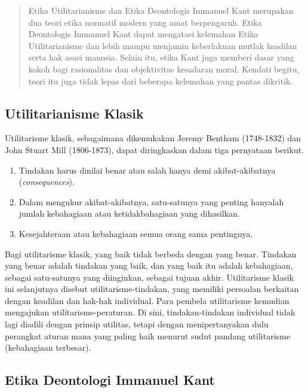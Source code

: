 \documentclass[11pt,twoside,a5paper,openany]{memoir}
\def\tightlist{}
\begin{document}
\begin{quote}
Etika Utilitarianisme dan Etika Deontologis Immanuel Kant merupakan dua
teori etika normatif modern yang amat berpengaruh. Etika Deontologis
Immanuel Kant dapat mengatasi kelemahan Etika Utilitarianisme dan lebih
mampu menjamin keberlakuan mutlak keadilan serta hak asasi manusia.
Selain itu, etika Kant juga memberi dasar yang kokoh bagi rasionalitas
dan objektivitas kesadaran moral. Kendati begitu, teori itu juga tidak
lepas dari beberapa kelemahan yang pantas dikritik.
\end{quote}

\hypertarget{utilitarianisme-klasik}{%
\subsection{Utilitarianisme Klasik}\label{utilitarianisme-klasik}}

Utilitarisme klasik, sebagaimana dikemukakan Jeremy Bentham (1748-1832)
dan John Stuart Mill (1806-1873), dapat diringkaskan dalam tiga
pernyataan berikut.

\begin{enumerate}
\def\labelenumi{\arabic{enumi}.}
\tightlist
\item
  Tindakan harus dinilai benar atau salah hanya demi akibat-akibatnya
  (\emph{consequences}).
\item
  Dalam mengukur akibat-akibatnya, satu-satunya yang penting hanyalah
  jumlah kebahagiaan atau ketidakbahagiaan yang dihasilkan.
\item
  Kesejahteraan atau kebahagiaan semua orang sama pentingnya.
\end{enumerate}

Bagi utilitarisme klasik, yang baik tidak berbeda dengan yang benar.
Tindakan yang benar adalah tindakan yang baik, dan yang baik itu adalah
kebahagiaan, sebagai satu-satunya yang diinginkan, sebagai tujuan akhir.
Utilitarisme klasik ini selanjutnya disebut utilitarisme-tindakan, yang
memiliki persoalan berkaitan dengan keadilan dan hak-hak individual.
Para pembela utilitarisme kemudian mengajukan utilitarisme-peraturan. Di
sini, tindakan-tindakan individual tidak lagi diadili dengan prinsip
utilitas, tetapi dengan menipertanyakan dulu perangkat aturan mana yang
paling haik menurut sudut pandang utilitarisme (kebahagiaan terbesar).

\hypertarget{etika-deontologi-immanuel-kant}{%
\subsection{Etika Deontologi Immanuel
Kant}\label{etika-deontologi-immanuel-kant}}
\end{document}
